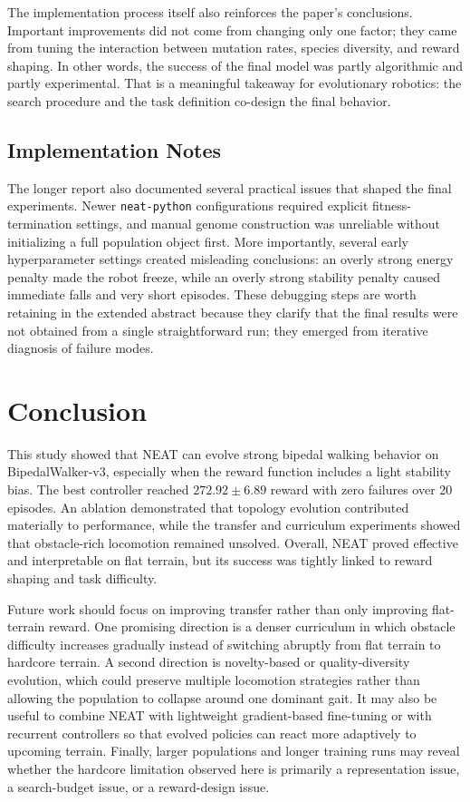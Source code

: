 \documentclass[journal]{IEEEtran}
\begin{document}
The implementation process itself also reinforces the paper's conclusions. Important improvements did not come from changing only one factor; they came from tuning the interaction between mutation rates, species diversity, and reward shaping. In other words, the success of the final model was partly algorithmic and partly experimental. That is a meaningful takeaway for evolutionary robotics: the search procedure and the task definition co-design the final behavior.

\subsection{Implementation Notes}
The longer report also documented several practical issues that shaped the final experiments. Newer \texttt{neat-python} configurations required explicit fitness-termination settings, and manual genome construction was unreliable without initializing a full population object first. More importantly, several early hyperparameter settings created misleading conclusions: an overly strong energy penalty made the robot freeze, while an overly strong stability penalty caused immediate falls and very short episodes. These debugging steps are worth retaining in the extended abstract because they clarify that the final results were not obtained from a single straightforward run; they emerged from iterative diagnosis of failure modes.

\section{Conclusion}
This study showed that NEAT can evolve strong bipedal walking behavior on BipedalWalker-v3, especially when the reward function includes a light stability bias. The best controller reached $272.92 \pm 6.89$ reward with zero failures over 20 episodes. An ablation demonstrated that topology evolution contributed materially to performance, while the transfer and curriculum experiments showed that obstacle-rich locomotion remained unsolved. Overall, NEAT proved effective and interpretable on flat terrain, but its success was tightly linked to reward shaping and task difficulty.

Future work should focus on improving transfer rather than only improving flat-terrain reward. One promising direction is a denser curriculum in which obstacle difficulty increases gradually instead of switching abruptly from flat terrain to hardcore terrain. A second direction is novelty-based or quality-diversity evolution, which could preserve multiple locomotion strategies rather than allowing the population to collapse around one dominant gait. It may also be useful to combine NEAT with lightweight gradient-based fine-tuning or with recurrent controllers so that evolved policies can react more adaptively to upcoming terrain. Finally, larger populations and longer training runs may reveal whether the hardcore limitation observed here is primarily a representation issue, a search-budget issue, or a reward-design issue.
\end{document}
